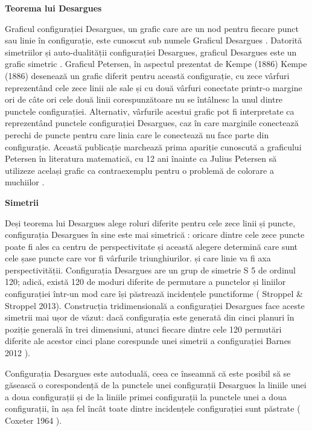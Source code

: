 \documentclass[3p]{elsarticle}
\begin{document}
	\begin{center}
	\textbf{Teorema lui Desargues}
\end{center}

Graficul configurației Desargues, un grafic care are un nod pentru fiecare punct sau linie în configurație, este cunoscut sub numele Graficul Desargues . Datorită simetriilor și auto-dualității configurației Desargues, graficul Desargues este un grafic simetric .
Graficul Petersen, în aspectul prezentat de Kempe (1886)
Kempe (1886) desenează un grafic diferit pentru această configurație, cu zece vârfuri reprezentând cele zece linii ale sale și cu două vârfuri conectate printr-o margine ori de câte ori cele două linii corespunzătoare nu se întâlnesc la unul dintre punctele configurației. Alternativ, vârfurile acestui grafic pot fi interpretate ca reprezentând punctele configurației Desargues, caz în care marginile conectează perechi de puncte pentru care linia care le conectează nu face parte din configurație. Această publicație marchează prima apariție cunoscută a graficului Petersen în literatura matematică, cu 12 ani înainte ca Julius Petersen să utilizeze același grafic ca contraexemplu pentru o problemă de colorare a muchiilor .
 \\
 \par
 \textbf{Simetrii}
 \par
 Deși teorema lui Desargues alege roluri diferite pentru cele zece linii și puncte, configurația Desargues în sine este mai simetrică : oricare dintre cele zece puncte poate fi ales ca centru de perspectivitate și această alegere determină care sunt cele șase puncte care vor fi vârfurile triunghiurilor. și care linie va fi axa perspectivității. Configurația Desargues are un grup de simetrie S 5 de ordinul 120; adică, există 120 de moduri diferite de permutare a punctelor și liniilor configurației într-un mod care își păstrează incidențele punctiforme ( Stroppel $\&$ Stroppel 2013). Construcția tridimensională a configurației Desargues face aceste simetrii mai ușor de văzut: dacă configurația este generată din cinci planuri în poziție generală în trei dimensiuni, atunci fiecare dintre cele 120 permutări diferite ale acestor cinci plane corespunde unei simetrii a configurației Barnes 2012 ).
 \par
 Configurația Desargues este autoduală, ceea ce înseamnă că este posibil să se găsească o corespondență de la punctele unei configurații Desargues la liniile unei a doua configurații și de la liniile primei configurații la punctele unei a doua configurații, în așa fel încât toate dintre incidențele configurației sunt păstrate ( Coxeter 1964 ).
 
\end{document}
